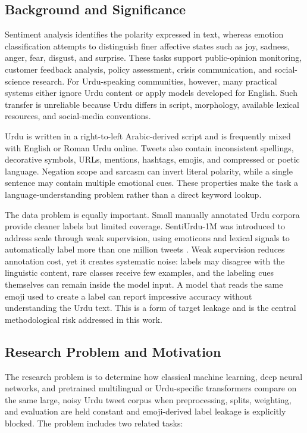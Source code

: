 \documentclass[conference]{IEEEtran}
\begin{document}
\subsection{Background and Significance}

Sentiment analysis identifies the polarity expressed in text, whereas emotion classification attempts to distinguish finer affective states such as joy, sadness, anger, fear, disgust, and surprise. These tasks support public-opinion monitoring, customer feedback analysis, policy assessment, crisis communication, and social-science research. For Urdu-speaking communities, however, many practical systems either ignore Urdu content or apply models developed for English. Such transfer is unreliable because Urdu differs in script, morphology, available lexical resources, and social-media conventions.

Urdu is written in a right-to-left Arabic-derived script and is frequently mixed with English or Roman Urdu online. Tweets also contain inconsistent spellings, decorative symbols, URLs, mentions, hashtags, emojis, and compressed or poetic language. Negation scope and sarcasm can invert literal polarity, while a single sentence may contain multiple emotional cues. These properties make the task a language-understanding problem rather than a direct keyword lookup.

The data problem is equally important. Small manually annotated Urdu corpora provide cleaner labels but limited coverage. SentiUrdu-1M was introduced to address scale through weak supervision, using emoticons and lexical signals to automatically label more than one million tweets \cite{ghafoor2023sentiurdu}. Weak supervision reduces annotation cost, yet it creates systematic noise: labels may disagree with the linguistic content, rare classes receive few examples, and the labeling cues themselves can remain inside the model input. A model that reads the same emoji used to create a label can report impressive accuracy without understanding the Urdu text. This is a form of target leakage and is the central methodological risk addressed in this work.

\subsection{Research Problem and Motivation}

The research problem is to determine how classical machine learning, deep neural networks, and pretrained multilingual or Urdu-specific transformers compare on the same large, noisy Urdu tweet corpus when preprocessing, splits, weighting, and evaluation are held constant and emoji-derived label leakage is explicitly blocked. The problem includes two related tasks:
\end{document}
